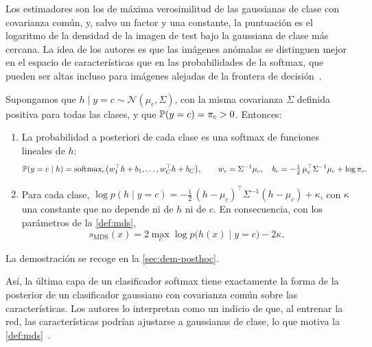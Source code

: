 Los estimadores son los de máxima verosimilitud de las gaussianas de clase con covarianza común, y, salvo un factor y una constante, la puntuación es el logaritmo de la densidad de la imagen de test bajo la gaussiana de clase más cercana. La idea de los autores es que las imágenes anómalas se distinguen mejor en el espacio de características que en las probabilidades de la softmax, que pueden ser altas incluso para imágenes alejadas de la frontera de decisión~\cite[sec.~2.1]{lee2018}.

\begin{proposicion}\label{prop:mds-lda}
Supongamos que $h \mid y = c \sim \mathcal{N}(\mu_c, \Sigma)$, con la misma covarianza $\Sigma$ definida positiva para todas las clases, y que $\mathbb{P}(y = c) = \pi_c > 0$. Entonces:
\begin{enumerate}
  \item La probabilidad a posteriori de cada clase es una softmax de funciones lineales de $h$:
  \[
    \mathbb{P}(y = c \mid h) = \operatorname{softmax}_c\bigl(w_1^{\top} h + b_1, \dots, w_C^{\top} h + b_C\bigr), \qquad
    w_c = \Sigma^{-1} \mu_c, \quad b_c = -\tfrac{1}{2}\, \mu_c^{\top} \Sigma^{-1} \mu_c + \log \pi_c .
  \]
  \item Para cada clase, $\log p(h \mid y = c) = -\tfrac{1}{2}\, (h - \mu_c)^{\top} \Sigma^{-1} (h - \mu_c) + \kappa$, con $\kappa$ una constante que no depende ni de $h$ ni de $c$. En consecuencia, con los parámetros de la \cref{def:mds},
  \[
    s_{\mathrm{MDS}}(x) = 2 \max_{c} \log p\bigl(h(x) \mid y = c\bigr) - 2\kappa .
  \]
\end{enumerate}
\end{proposicion}
La demostración se recoge en la \cref{sec:dem-posthoc}.

Así, la última capa de un clasificador softmax tiene exactamente la forma de la posterior de un clasificador gaussiano con covarianza común sobre las características. Los autores lo interpretan como un indicio de que, al entrenar la red, las características podrían ajustarse a gaussianas de clase, lo que motiva la \cref{def:mds}~\cite[ap.~A]{lee2018}.

